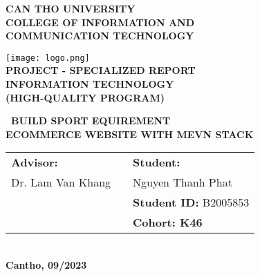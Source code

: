
\begin{titlepage}
    \begin{center}

        \textbf{CAN THO UNIVERSITY\\}
        \textbf{COLLEGE OF INFORMATION AND\\ COMMUNICATION TECHNOLOGY\\[1cm]}

        \texttt{[image: logo.png]}\\[1cm]

        \textbf{PROJECT - SPECIALIZED REPORT \\}
        \textbf{  INFORMATION TECHNOLOGY \\}
        \textbf{(HIGH-QUALITY PROGRAM)\\[2cm]}

        \textbf{{\Large\ BUILD  SPORT EQUIREMENT\\ ECOMMERCE WEBSITE WITH MEVN STACK}}
        \\[3.5cm]

        \begin{tabular}{ l c l l }
            \textbf{Advisor:} & \hspace{2cm} & \multicolumn{2}{l}{\textbf{Student:}}             \\
            Dr. Lam Van Khang &              & Nguyen Thanh Phat                                 \\
                              &              & \multicolumn{2}{l}{\textbf{Student ID:} B2005853} \\
                              &              & \multicolumn{2}{l}{\textbf{Cohort: K46}}
        \end{tabular}
        \\[4cm]

        \textbf{Cantho, 09/2023}

    \end{center}

\end{titlepage}